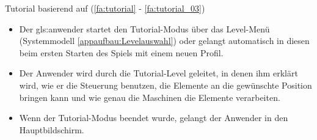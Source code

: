 \documentclass{scrartcl}
\begin{document}
\begin{telist}
	\item Tutorial basierend auf (\ref{fa:tutorial} - \ref{fa:tutorial_03})
	\begin{itemize}
		\item Der \gls{gls:anwender} startet den Tutorial-Modus über das Level-Menü (Systemmodell \ref{appaufbau:Levelauswahl}) oder gelangt automatisch in diesen beim ersten Starten des Spiels mit einem neuen Profil.
		\item Der Anwender wird durch die Tutorial-Level geleitet, in denen ihm erklärt wird, wie er die Steuerung benutzen, die Elemente an die gewünschte Position bringen kann und wie genau die Maschinen die Elemente verarbeiten.
		\item Wenn der Tutorial-Modus beendet wurde, gelangt der Anwender in den Hauptbildschirm.
	\end{itemize}


\end{telist}
\end{document}
